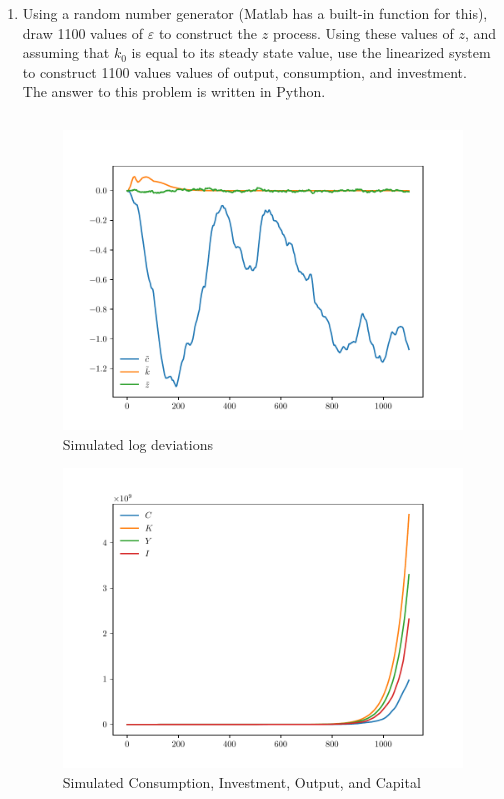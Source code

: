 \documentclass[11pt]{article}
\begin{document}
\begin{enumerate}
\newpage
\item Using a random number generator (Matlab has a built-in function for
this), draw 1100 values of $\varepsilon$ to construct the $z$ process. Using these values of $z$,
and assuming that $k_0$ is equal to its steady state value, use the linearized system
to construct 1100 values values of output, consumption, and investment.
\\ The answer to this problem is written in Python.
\inputminted[linenos]{python}{q8.py}

\begin{figure}[htp]
\begin{center}
\includegraphics[scale=0.75]{log-linear-simulations.pdf}
\caption{Simulated log deviations}
\end{center}
\end{figure}

\begin{figure}[htp]
\begin{center}
\includegraphics[scale=0.75]{my-economy-simulations.pdf}
\caption{Simulated Consumption, Investment, Output, and Capital}
\end{center}
\end{figure}



\end{enumerate}
\end{document}
